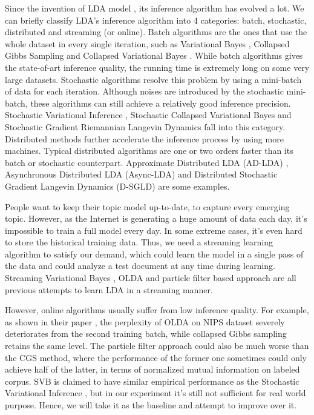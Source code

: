 \documentclass{article}
\begin{document}
Since the invention of LDA model \cite{blei2003latent}, its inference algorithm has evolved a lot. We can briefly classify LDA's inference algorithm into 4 categories: batch, stochastic, distributed and streaming (or online). Batch algorithms are the ones that use the whole dataset in every single iteration, such as Variational Bayes \cite{blei2003latent}, Collapsed Gibbs Sampling \cite{griffiths2004finding} and Collapsed Variational Bayes \cite{teh2006collapsed}. While batch algorithms gives the state-of-art inference quality, the running time is extremely long on some very large datasets. Stochastic algorithms resolve this problem by using a mini-batch of data for each iteration. Although noises are introduced by the stochastic mini-batch, these algorithms can still achieve a relatively good inference precision. Stochastic Variational Inference \cite{hoffman2013stochastic}, Stochastic Collapsed Variational Bayes \cite{foulds2013stochastic} and Stochastic Gradient Riemannian Langevin Dynamics \cite{patterson2013stochastic} fall into this category. Distributed methods further accelerate the inference process by using more machines. Typical distributed algorithms are one or two orders faster than its batch or stochastic counterpart. Approximate Distributed LDA (AD-LDA) \cite{newman2007distributed}, Asynchronous Distributed LDA (Async-LDA) \cite{newman2009distributed} and Distributed Stochastic Gradient Langevin
Dynamics (D-SGLD) \cite{ahn2014distributed} are some examples. 

People want to keep their topic model up-to-date, to capture every emerging topic. However, as the Internet is generating a huge amount of data each day, it's impossible to train a full model every day. In some extreme cases, it's even hard to store the historical training data. Thus, we need a streaming learning algorithm to satisfy our demand, which could learn the model in a single pass of the data and could analyze a test document at any time during learning. Streaming Variational Bayes \cite{broderick2013streaming}, OLDA \cite{alsumait2008line} and particle filter based approach \cite{canini2009online} are all previous attempts to learn LDA in a streaming manner.

However, online algorithms usually suffer from low inference quality. For example, as shown in their paper \cite{alsumait2008line}, the perplexity of OLDA on NIPS dataset severely deteriorates from the second training batch, while collapsed Gibbs sampling retains the same level. The particle filter approach \cite{canini2009online} could also be much worse than the CGS method, where the performance of the former one sometimes could only achieve half of the latter, in terms of normalized mutual information on labeled corpus. SVB is claimed to have similar empirical performance as the Stochastic Variational Inference \cite{broderick2013streaming}, but in our experiment it's still not sufficient for real world purpose. Hence, we will take it as the baseline and attempt to improve over it.
\end{document}
